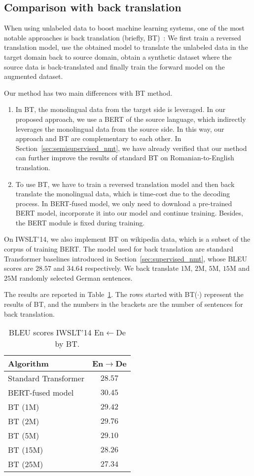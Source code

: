 \documentclass{article} \usepackage{iclr2020_conference,times}
\begin{document}
\subsection{Comparison with back translation}
When using unlabeled data to boost machine learning systems, one of the most notable approaches is back translation (briefly, BT)~\citep{sennrich2016improving}: We first train a reversed translation model, use the obtained model to translate the unlabeled data in the target domain back to source domain, obtain a synthetic dataset where the source data is back-translated and finally train the forward model on the augmented dataset. 

Our method has two main differences with BT method. 
\begin{enumerate}
\item In BT, the monolingual data from the target side is leveraged. In our proposed approach, we use a BERT of the source language, which indirectly leverages the monolingual data from the source side. In this way, our approach and BT are complementary to each other. In Section~\ref{sec:semisupervised_nmt}, we have already verified that our method can further improve the results of standard BT on Romanian-to-English translation.
\item To use BT, we have to train a reversed translation model and then back translate the monolingual data, which is time-cost due to the decoding process. In BERT-fused model, we only need to download a pre-trained BERT model, incorporate it into our model and continue training. Besides, the BERT module is fixed during training.
\end{enumerate}

On IWSLT'14, we also implement BT on wikipedia data, which is a subset of the corpus of training BERT. The model used for back translation are standard Transformer baselines introduced in Section~\ref{sec:supervised_nmt}, whose BLEU scores are $28.57$ and $34.64$ respectively. We back translate $1$M, $2$M, $5$M, $15$M and $25$M randomly selected German sentences. 

The results are reported in Table~\ref{tab:results_bt_wiki}. The rows started with BT($\cdot$) represent the results of BT, and the numbers in the brackets are the number of sentences for back translation. 



\begin{table}[!htbp]
\centering
\caption{BLEU scores IWSLT'14 En$\leftarrow$De by BT.}
\begin{tabular}{lc}
\toprule
Algorithm & En$\to$De  \\
\midrule
Standard Transformer & $28.57$ \\
BERT-fused model & $30.45$  \\
\midrule
BT (1M)  & $29.42$ \\
BT (2M)  & $29.76$ \\
BT (5M)  & $29.10$\\
BT (15M) & $28.26$ \\
BT (25M) & $27.34$ \\
\bottomrule
\end{tabular}
\label{tab:results_bt_wiki}
\end{table}
\end{document}
